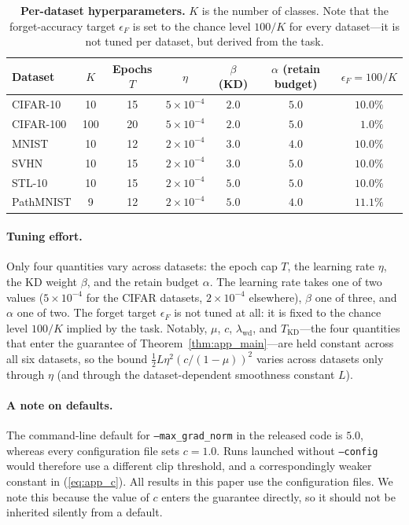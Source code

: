 \documentclass{article}
\theoremstyle{remark}
\theoremstyle{plain}
\begin{document}
\begin{table}[t]
\centering
\caption{\textbf{Per-dataset hyperparameters.} $K$ is the number of classes.
Note that the forget-accuracy target $\epsilon_F$ is set to the chance level
$100/K$ for every dataset---it is not tuned per dataset, but derived from the
task.}
\label{tab:app_perdataset}
\begin{tabular}{@{}lcccccc@{}}
\toprule
Dataset & $K$ & Epochs $T$ & $\eta$ & $\beta$ (KD) & $\alpha$ (retain budget) & $\epsilon_F = 100/K$ \\
\midrule
CIFAR-10  & 10  & 15 & $5\times10^{-4}$ & $2.0$ & $5.0$ & $10.0\%$ \\
CIFAR-100 & 100 & 20 & $5\times10^{-4}$ & $2.0$ & $5.0$ & $\phantom{0}1.0\%$ \\
MNIST     & 10  & 12 & $2\times10^{-4}$ & $3.0$ & $4.0$ & $10.0\%$ \\
SVHN      & 10  & 15 & $2\times10^{-4}$ & $3.0$ & $5.0$ & $10.0\%$ \\
STL-10    & 10  & 15 & $2\times10^{-4}$ & $5.0$ & $5.0$ & $10.0\%$ \\
PathMNIST & \phantom{0}9 & 12 & $2\times10^{-4}$ & $5.0$ & $4.0$ & $11.1\%$ \\
\bottomrule
\end{tabular}
\end{table}

\paragraph{Tuning effort.}
Only four quantities vary across datasets: the epoch cap $T$, the learning rate
$\eta$, the KD weight $\beta$, and the retain budget $\alpha$. The learning rate
takes one of two values ($5\times10^{-4}$ for the CIFAR datasets,
$2\times10^{-4}$ elsewhere), $\beta$ one of three, and $\alpha$ one of two. The
forget target $\epsilon_F$ is not tuned at all: it is fixed to the chance level
$100/K$ implied by the task. Notably, $\mu$, $c$, $\lambda_{\mathrm{wd}}$, and
$T_{\mathrm{KD}}$---the four quantities that enter the guarantee of
Theorem~\ref{thm:app_main}---are held constant across all six datasets, so the
bound $\tfrac12 L\eta^2(c/(1-\mu))^2$ varies across datasets only through
$\eta$ (and through the dataset-dependent smoothness constant $L$).

\paragraph{A note on defaults.}
The command-line default for \texttt{--max\_grad\_norm} in the released code is
$5.0$, whereas every configuration file sets $c=1.0$. Runs launched without
\texttt{--config} would therefore use a different clip threshold, and a
correspondingly weaker constant in
(\ref{eq:app_c}). All results in this paper use the configuration files. We note
this because the value of $c$ enters the guarantee directly, so it should not be
inherited silently from a default.
\end{document}
